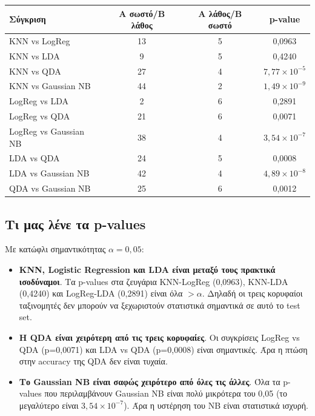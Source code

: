 \documentclass[11pt,a4paper]{article}
\begin{document}
\begin{center}
{\small
\begin{tabular}{lccc}
\toprule
Σύγκριση & A σωστό/B λάθος & A λάθος/B σωστό & p-value \\
\midrule
KNN vs LogReg & 13 & 5 & 0,0963 \\
KNN vs LDA & 9 & 5 & 0,4240 \\
KNN vs QDA & 27 & 4 & \(7{,}77 \times 10^{-5}\) \\
KNN vs Gaussian NB & 44 & 2 & \(1{,}49 \times 10^{-9}\) \\
LogReg vs LDA & 2 & 6 & 0,2891 \\
LogReg vs QDA & 21 & 6 & 0,0071 \\
LogReg vs Gaussian NB & 38 & 4 & \(3{,}54 \times 10^{-7}\) \\
LDA vs QDA & 24 & 5 & 0,0008 \\
LDA vs Gaussian NB & 42 & 4 & \(4{,}89 \times 10^{-8}\) \\
QDA vs Gaussian NB & 25 & 6 & 0,0012 \\
\bottomrule
\end{tabular}
}
\end{center}

\subsection{Τι μας λένε τα p-values}

Με κατώφλι σημαντικότητας \(\alpha = 0{,}05\):
\begin{itemize}
    \item \textbf{KNN, Logistic Regression και LDA είναι μεταξύ τους
    πρακτικά ισοδύναμοι}. Τα p-values στα ζευγάρια KNN-LogReg
    (0,0963), KNN-LDA (0,4240) και LogReg-LDA (0,2891) είναι όλα
    \(>\alpha\). Δηλαδή οι τρεις κορυφαίοι ταξινομητές δεν μπορούν να
    ξεχωριστούν στατιστικά σημαντικά σε αυτό το test set.

    \item \textbf{Η QDA είναι χειρότερη από τις τρεις κορυφαίες}. Οι
    συγκρίσεις LogReg vs QDA (p=0,0071) και LDA vs QDA (p=0,0008)
    είναι σημαντικές. Άρα η πτώση στην accuracy της QDA δεν είναι
    τυχαία.

    \item \textbf{Το Gaussian NB είναι σαφώς χειρότερο από όλες τις
    άλλες}. Όλα τα p-values που περιλαμβάνουν Gaussian NB είναι πολύ
    μικρότερα του 0,05 (το μεγαλύτερο είναι \(3{,}54 \times 10^{-7}\)).
    Άρα η υστέρηση του NB είναι στατιστικά ισχυρή.
\end{itemize}
\end{document}
